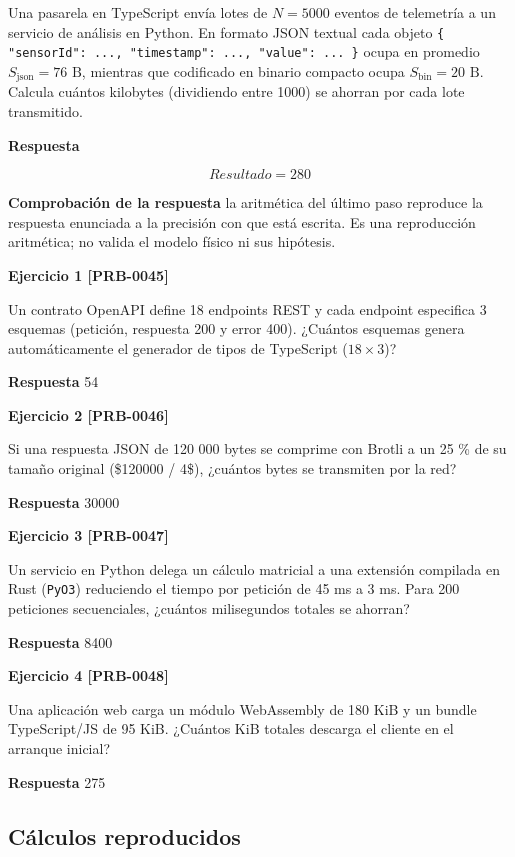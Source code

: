 \documentclass{book}
\begin{document}
Una pasarela en TypeScript envía lotes de \(N = 5000\) eventos de telemetría a un servicio de análisis en Python. En formato JSON textual cada objeto \texttt{\{ "sensorId": ..., "timestamp": ..., "value": ... \}} ocupa en promedio \(S_{\text{json}} = 76\text{ B}\), mientras que codificado en binario compacto ocupa \(S_{\text{bin}} = 20\text{ B}\). Calcula cuántos kilobytes (dividiendo entre 1000) se ahorran por cada lote transmitido.

\noindent\textbf{Respuesta}

\[
Resultado = 280
\]

\noindent\textbf{Comprobación de la respuesta} la aritmética del último paso reproduce la respuesta enunciada a la precisión con que está escrita. Es una reproducción aritmética; no valida el modelo físico ni sus hipótesis.

\noindent\textbf{Ejercicio 1 [PRB-0045]}

Un contrato OpenAPI define 18 endpoints REST y cada endpoint especifica 3 esquemas (petición, respuesta 200 y error 400). ¿Cuántos esquemas genera automáticamente el generador de tipos de TypeScript (\(18 \times 3\))?

\noindent\textbf{Respuesta} 54

\noindent\textbf{Ejercicio 2 [PRB-0046]}

Si una respuesta JSON de 120 000 bytes se comprime con Brotli a un 25 \% de su tamaño original (\$120000 / 4\$), ¿cuántos bytes se transmiten por la red?

\noindent\textbf{Respuesta} 30000

\noindent\textbf{Ejercicio 3 [PRB-0047]}

Un servicio en Python delega un cálculo matricial a una extensión compilada en Rust (\texttt{PyO3}) reduciendo el tiempo por petición de 45 ms a 3 ms. Para 200 peticiones secuenciales, ¿cuántos milisegundos totales se ahorran?

\noindent\textbf{Respuesta} 8400

\noindent\textbf{Ejercicio 4 [PRB-0048]}

Una aplicación web carga un módulo WebAssembly de 180 KiB y un bundle TypeScript/JS de 95 KiB. ¿Cuántos KiB totales descarga el cliente en el arranque inicial?

\noindent\textbf{Respuesta} 275

\subsection*{Cálculos reproducidos}
\end{document}
